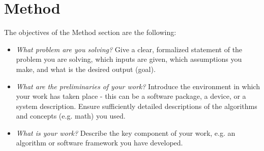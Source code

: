 %
\newpage
\chapter{Method}
The objectives of the Method section are the following: 
\begin{itemize}
 
 \item \textit{What problem are you solving?} Give a clear, formalized statement of the problem you are solving, \ie which inputs are given, which assumptions you make, and what is the desired output (goal).
 \item \textit{What are the preliminaries of your work?} Introduce the environment in which your work has taken place - this can be a software package, a device, or a system description. Ensure sufficiently detailed descriptions of the algorithms and concepts (e.g. math) you used.
 \item \textit{What is your work?} Describe the key component of your work, e.g. an algorithm or software framework you have developed.
\end{itemize}
